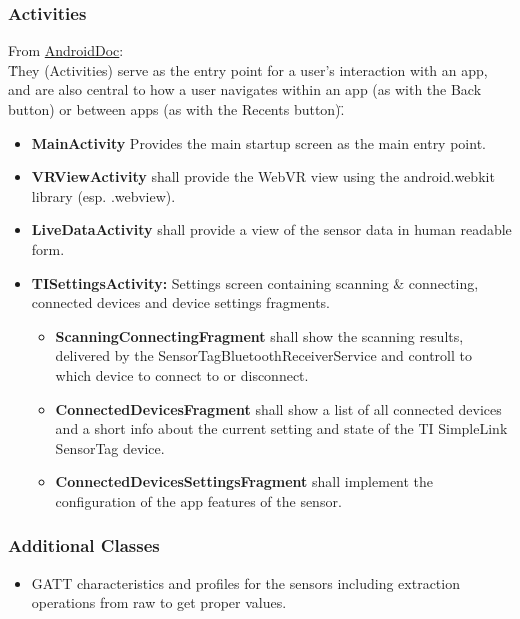 \subsubsection{Activities}
From \href{https://developer.android.com/guide/components/services.html}{AndroidDoc}: \\
\"They (Activities) serve as the entry point for a user's interaction with an app, and are also central to how a user navigates within an app (as with the Back button) or between apps (as with the Recents button)\". \newline
\begin{itemize}
  \item \textbf{MainActivity} Provides the main startup screen as the main entry point.
  \item \textbf{VRViewActivity} shall provide the WebVR view using the android.webkit library (esp. .webview).
  \item \textbf{LiveDataActivity} shall provide a view of the sensor data in human readable form.
  \item \textbf{TISettingsActivity:} Settings screen containing scanning \& connecting, connected devices and device settings fragments. \\
  \begin{itemize}
    \item \textbf{ScanningConnectingFragment} shall show the scanning results, delivered by the SensorTagBluetoothReceiverService and controll to which device to connect to or disconnect.
    \item \textbf{ConnectedDevicesFragment} shall show a list of all connected devices and a short info about the current setting and state of the TI SimpleLink SensorTag device.
    \item \textbf{ConnectedDevicesSettingsFragment} shall implement the configuration of the app features of the sensor.
  \end{itemize}
\end{itemize}

\subsubsection{Additional Classes}
\begin{itemize}
  \item GATT characteristics and profiles for the sensors including extraction operations from raw to get proper values.
\end{itemize}
